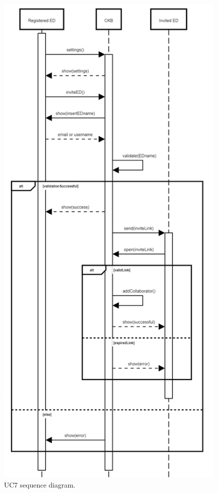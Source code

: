 \begin{center}
  \begin{figure} [H]
    \begin{center}
        \includegraphics[width=\textwidth,height=\textheight,keepaspectratio]{Images/SequenceDiagrams/UC7.png}
        \caption{UC7 sequence diagram.}
        \label{fig: UC7_sequence_diagram}
    \end{center}
  \end{figure}
\end{center}

